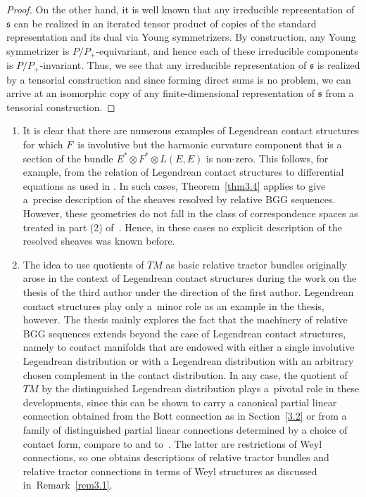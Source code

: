 \documentclass[pdftex]{sigma}
\numberwithin{equation}{section}
\def\frak{\mathfrak}
\begin{document}
\begin{proof}
On the other hand, it is well known that any irreducible representation of $\frak s$
can be realized in an iterated tensor product of copies of the standard
representation and its dual via Young symmetrizers. By construction, any Young
symmetrizer is $P/P_+$-equivariant, and hence each of these irreducible components is
$P/P_+$-invariant. Thus, we see that any irreducible representation of $\frak s$ is
realized by a tensorial construction and since forming direct sums is no problem, we
can arrive at an isomorphic copy of any finite-dimensional representation of $\frak
s$ from a tensorial construction.
\end{proof}

\begin{Remark}\label{rem3.4} \quad
\begin{enumerate}\itemsep=0pt
\item[(1)] It is clear that there are numerous examples of
Legendrean contact structures for which $F$~is involutive but the harmonic curvature
component that is a section of the bundle $E^*\otimes F^*\otimes L(E,E)$ is non-zero.
This follows, for example, from the relation of Legendrean contact structures to
differential equations as used in \cite{MFMZ}. In such cases, Theorem~\ref{thm3.4}
applies to give a~precise description of the sheaves resolved by relative BGG
sequences. However, these geometries do not fall in the class of correspondence
spaces as treated in part (2) of~\mbox{\cite[Theorem~4.11]{Rel-BGG2}}. Hence, in these
cases no explicit description of the resolved sheaves was known before.
\item[(2)] The idea to use quotients of $TM$ as basic relative tractor bundles originally
arose in the context of Legendrean contact structures during the work on the thesis
\cite{Michal-thesis} of the third author under the direction of the first
author. Legendrean contact structures play only a~minor role as an example in the
thesis, however. The thesis mainly explores the fact that the machinery of relative
BGG sequences extends beyond the case of Legendrean contact structures, namely to
contact manifolds that are endowed with either a single involutive Legendrean
distribution or with a Legendrean distribution with an arbitrary chosen complement in
the contact distribution. In any case, the quotient of $TM$ by the distinguished
Legendrean distribution plays a~pivotal role in these developments, since this can be
shown to carry a canonical partial linear connection obtained from the Bott
connection as in Section~\ref{3.2} or from a family of distinguished partial linear
connections determined by a choice of contact form, compare to \cite[Section 5.2.14]{book}
and to~\cite{Michal-article}. The latter are restrictions of Weyl
connections, so one obtains descriptions of relative tractor bundles and relative
tractor connections in terms of Weyl structures as discussed in~Remark~\ref{rem3.1}.
\end{enumerate}
\end{Remark}
\end{document}
